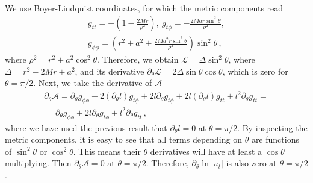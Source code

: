 \documentclass{aa}
\begin{document}
\begin{appendix}
\begin{eqnarray}
\end{eqnarray}
We use Boyer-Lindquist coordinates, for which the metric components read
\begin{eqnarray}
g_{tt} = - \left(1 - \frac{2Mr}{\rho^2}\right), \ g_{t\phi} = -\frac{2Mar\sin^2\theta}{\rho^2},
\nonumber \\
g_{\phi\phi} = \left(r^2 + a^2 + \frac{2Ma^2r\sin^2\theta}{\rho^2}\right) \sin^2 \theta\,,
\end{eqnarray}
where $\rho^2 = r^2 + a^2\cos^2 \theta$. Therefore, we obtain $\mathcal{L} = \Delta \sin^2 \theta$, where $\Delta = r^2 - 2Mr + a^2$, and its derivative $\partial_{\theta}\mathcal{L} = 2 \Delta \sin \theta \cos \theta$, which is zero for $\theta = \pi/2$. Next, we take the derivative of $\mathcal{A}$
\begin{eqnarray}
\partial_{\theta} \mathcal{A} = \partial_{\theta} g_{\phi\phi} + 2 (\partial_{\theta} l) g_{t\phi} + 2l\partial_{\theta} g_{t\phi} + 2l(\partial_{\theta} l) g_{tt} + l^2 \partial_{\theta} g_{tt} = 
\nonumber \\
= \partial_{\theta} g_{\phi\phi} + 2l\partial_{\theta} g_{t\phi} + l^2 \partial_{\theta} g_{tt}\,,
\end{eqnarray}
where we have used the previous result that $\partial_{\theta} l=0$ at $\theta = \pi/2$. By inspecting the metric components, it is easy to see that all terms depending on $\theta$ are functions of $\sin^2 \theta$ or $\cos^2 \theta$. This means their $\theta$ derivatives will have at least a $\cos \theta$ multiplying. Then $\partial_{\theta} \mathcal{A} = 0$ at $\theta = \pi/2$. Therefore, $\partial_{\theta} \ln|u_t|$ is also zero at $\theta = \pi/2$.


\end{appendix}
\end{document}
